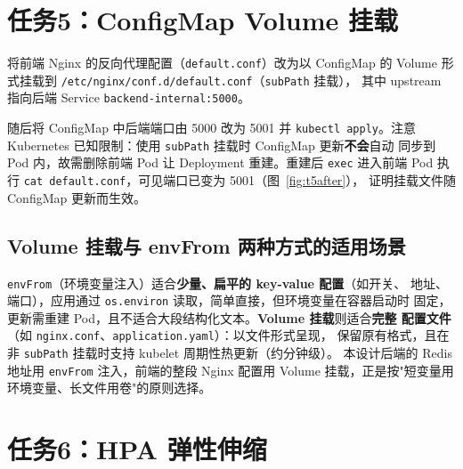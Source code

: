 
\section{任务5：ConfigMap Volume 挂载}

将前端 Nginx 的反向代理配置（\lstinline!default.conf!）改为以 ConfigMap 的 Volume
形式挂载到 \lstinline!/etc/nginx/conf.d/default.conf!（\lstinline!subPath! 挂载），
其中 upstream 指向后端 Service \lstinline!backend-internal:5000!。

随后将 ConfigMap 中后端端口由 5000 改为 5001 并 \lstinline!kubectl apply!。注意
Kubernetes 已知限制：使用 \lstinline!subPath! 挂载时 ConfigMap 更新\textbf{不会}自动
同步到 Pod 内，故需删除前端 Pod 让 Deployment 重建。重建后 \lstinline!exec! 进入前端
Pod 执行 \lstinline!cat default.conf!，可见端口已变为 5001（图~\ref{fig:t5after}），
证明挂载文件随 ConfigMap 更新而生效。


\subsection{Volume 挂载与 envFrom 两种方式的适用场景}

\lstinline!envFrom!（环境变量注入）适合\textbf{少量、扁平的 key-value 配置}（如开关、
地址、端口），应用通过 \lstinline!os.environ! 读取，简单直接，但环境变量在容器启动时
固定，更新需重建 Pod，且不适合大段结构化文本。\textbf{Volume 挂载}则适合\textbf{完整
配置文件}（如 \lstinline!nginx.conf!、\lstinline!application.yaml!）：以文件形式呈现，
保留原有格式，且在非 \lstinline!subPath! 挂载时支持 kubelet 周期性热更新（约分钟级）。
本设计后端的 Redis 地址用 \lstinline!envFrom! 注入，前端的整段 Nginx 配置用 Volume
挂载，正是按"短变量用环境变量、长文件用卷"的原则选择。

\section{任务6：HPA 弹性伸缩}

